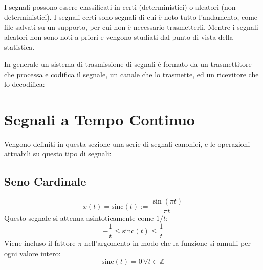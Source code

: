 \documentclass{article}
\numberwithin{equation}{subsection}
\begin{document}
I segnali possono essere classificati in certi (deterministici) o aleatori (non deterministici). I segnali certi sono segnali di cui è noto tutto l'andamento, come file salvati su un supporto, per cui non è necessario 
trasmetterli. Mentre i segnali aleatori non sono noti a priori e vengono studiati dal punto di vista della statistica. 

In generale un sistema di trasmissione di segnali è formato da un trasmettitore che processa e codifica il segnale, un canale che lo trasmette, ed un ricevitore che lo decodifica:
\begin{center}
\end{center}

\clearpage

\section{Segnali a Tempo Continuo}

Vengono definiti in questa sezione una serie di segnali canonici, e le operazioni attuabili su questo tipo di segnali:

\subsection{Seno Cardinale}

\begin{equation}
    x(t)=\mbox{sinc}(t):=\displaystyle\frac{\sin(\pi t)}{\pi t}
\end{equation}
Questo segnale si attenua asintoticamente come $1/t$: 
\begin{equation*}
    \displaystyle-\frac{1}{t}\leq\mbox{sinc}(t)\leq\frac{1}{t}
\end{equation*}
Viene incluso il fattore $\pi$ nell'argomento in modo che la funzione si annulli per ogni valore intero:
\begin{equation*}
    \mbox{sinc}(t)=0\,\forall t\in\mathbb{Z}
\end{equation*}

\begin{center}
\end{center}
\end{document}
